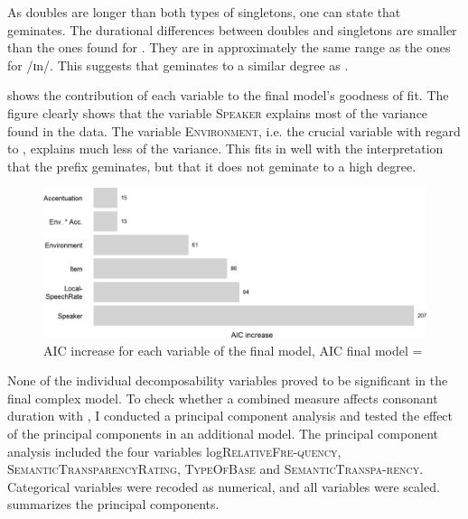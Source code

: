 As doubles are longer than both types of singletons, one can state that  geminates. The durational differences between doubles and singletons are smaller than the ones found for . They are in approximately the same range as the ones for /ɪn/. This suggests that  geminates to a similar degree as .



 shows the contribution of each variable to the final model's goodness of fit.
The figure clearly shows that the variable \textsc{Speaker} explains most of the variance found in the data. The variable 
\textsc{Environment}, i.e. the crucial variable with regard to , explains much less of the variance. This fits in well with the interpretation that the prefix  geminates, but that it does not geminate to a high degree.


\begin{figure}
	
	\includegraphics[scale=0.7]{images/Experiment/AICdecreaseDisComplex.png}
	\caption{AIC increase for each variable of the final model, AIC final model = }
	\label{fig:Effectsize dis experiment}

\end{figure}



None of the individual decomposability variables proved to be significant in the final complex model. To check whether a combined  measure affects consonant duration with , I conducted a principal component analysis and tested the effect of the principal components in an additional model. The principal component analysis included the four variables log\textsc{RelativeFre-quency}, \textsc{SemanticTransparencyRating}, \textsc{TypeOfBase} and \textsc{SemanticTranspa-rency}. Categorical variables were recoded as numerical, and all variables were scaled.  summarizes the principal components.



